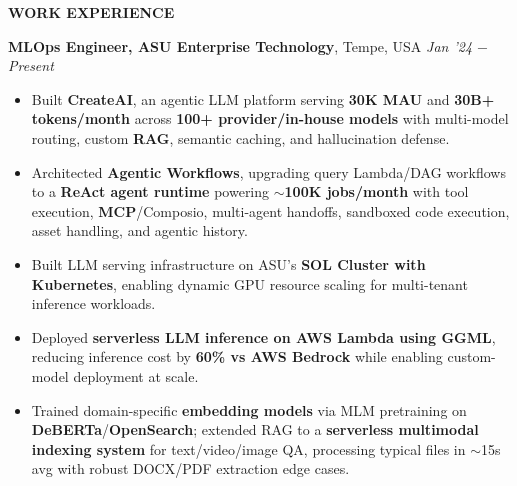 \documentclass[10pt,a4]{article}
\def\hrulefill{\leavevmode\leaders\hrule height 1pt\hfill\kern0pt}		%
\begin{document}
{\begin{flushleft}


\end{flushleft}


\begin{flushleft}
    {\Large \textbf{WORK EXPERIENCE}} %

    \vspace{1.5mm}
    \hspace{1.5mm} \textbf{\large MLOps Engineer, ASU Enterprise Technology},   Tempe, USA \hfill \textit{\large Jan '24 $-$ Present}	\\
    \begin{itemize}
        \item Built \textbf{CreateAI}, an agentic LLM platform serving \textbf{30K MAU} and \textbf{30B+ tokens/month} across \textbf{100+ provider/in-house models} with multi-model routing, custom \textbf{RAG}, semantic caching, and hallucination defense.
        \item Architected \textbf{Agentic Workflows}, upgrading query Lambda/DAG workflows to a \textbf{ReAct agent runtime} powering \textbf{$\sim$100K jobs/month} with tool execution, \textbf{MCP}/Composio, multi-agent handoffs, sandboxed code execution, asset handling, and agentic history.
        \item Built LLM serving infrastructure on ASU's \textbf{SOL Cluster with Kubernetes}, enabling dynamic GPU resource scaling for multi-tenant inference workloads.
        \item Deployed \textbf{serverless LLM inference on AWS Lambda using GGML}, reducing inference cost by \textbf{60\% vs AWS Bedrock} while enabling custom-model deployment at scale.
        \item Trained domain-specific \textbf{embedding models} via MLM pretraining on \textbf{DeBERTa}/\textbf{OpenSearch}; extended RAG to a \textbf{serverless multimodal indexing system} for text/video/image QA, processing typical files in $\sim$15s avg with robust DOCX/PDF extraction edge cases.
    \end{itemize}


\end{flushleft}}
\end{document}
